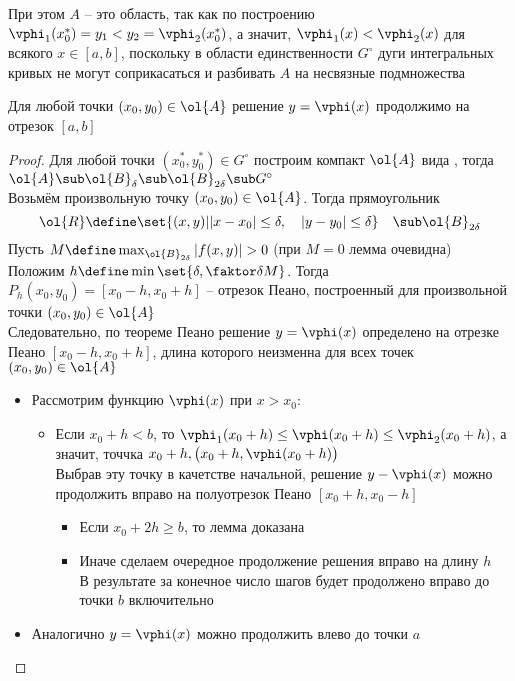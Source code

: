 При этом $ A $  -- это область, так как по построению $ \vphi_1(x_0^*) = y_1 < y_2 = \vphi_2(x_0^*) $, а значит, $ \vphi_1(x) < \vphi_2(x) $ для всякого $ x \in [a, b] $, поскольку в области единственности $ G^\circ $ дуги интегральных кривых не могут соприкасаться и разбивать $ A $ на несвязные подмножества

\begin{lemma}\label{lm:comp}
    Для любой точки $ (x_0, y_0) \in \ol{A} $ решение  $ y = \vphi(x) $ продолжимо на отрезок $ [a, b] $
\end{lemma}

\begin{proof}
    Для любой точки $ (x_0^*, y_0^*) \in G^\circ $ построим компакт $ \ol{A} $ вида , тогда $ \ol{A} \sub \ol{B}_\delta \sub \ol{B}_{2\delta} \sub G^\circ $ \\
    Возьмём произвольную точку $ (x_0, y_0) \in \ol{A} $. Тогда прямоугольник
    $$ \ol{R} \define \set{(x, y) | {} |x - x_0| \le \delta, \quad | y - y_0| \le \delta} \quad \sub \ol{B}_{2\delta} $$
    Пусть $ M \define \max_{\ol{B}_{2\delta}}|f(x, y)| > 0 $ (при $ M = 0 $ лемма очевидна) \\
    Положим $ h \define \min\set{\delta, \faktor\delta{M}} $. Тогда $ P_h(x_0, y_0) = [x_0 - h, x_0 + h] $ -- отрезок Пеано, построенный для произвольной точки $ (x_0, y_0) \in \ol{A} $ \\
    Следовательно, по теореме Пеано решение  $ y = \vphi(x) $ определено на отрезке Пеано $ [x_0 - h, x_0 + h] $, длина которого неизменна для всех точек $ (x_0, y_0) \in \ol{A} $
    \begin{itemize}
    	\item Рассмотрим функцию $ \vphi(x) $ при $ x > x_0 $:
        \begin{itemize}
        	\item Если $ x_0 + h < b $, то $ \vphi_1(x_0 + h) \le \vphi(x_0 + h) \le \vphi_2(x_0 + h) $, а значит, точчка $ x_0 + h, \big( x_0 + h, \vphi(x_0 + h) \big) $ \\
            Выбрав эту точку в качетстве начальной, решение $ y - \vphi(x) $ можно продолжить вправо на полуотрезок Пеано $ [x_0 + h, x_0 - h] $
            \begin{itemize}
            	\item Если $ x_0 + 2h \ge b $, то лемма доказана
                \item Иначе сделаем очередное продолжение решения вправо на длину $ h $ \\
                В результате за конечное число шагов будет продолжено вправо до точки $ b $ включительно
            \end{itemize}
        \end{itemize}
        \item Аналогично $ y = \vphi(x) $ можно продолжить влево до точки $ a $
    \end{itemize}
\end{proof}

